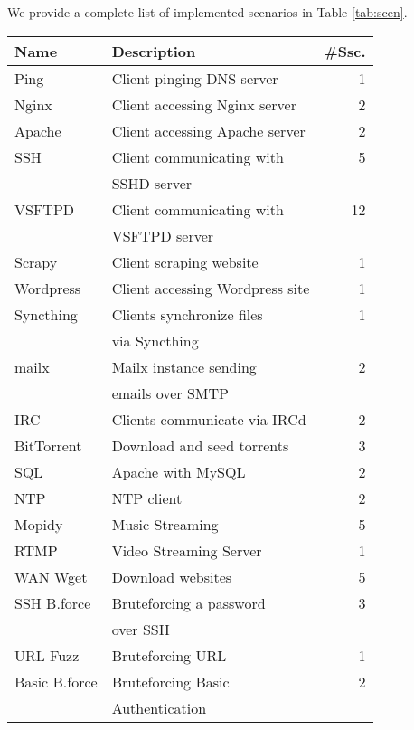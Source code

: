 \documentclass[sigconf]{acmart}
\begin{document}





We provide a complete list of implemented scenarios in Table \ref{tab:scen}.

\begin{table}
\begin{tabular}{l|l|r}
 \hline
 Name & Description & \#Ssc. \\
 \hline
 Ping & Client pinging DNS server & 1 \\
 Nginx & Client accessing Nginx server & 2\\
 Apache & Client accessing Apache server & 2\\
 SSH & Client communicating with & 5\\
 &SSHD server&\\
 VSFTPD & Client communicating with & 12\\
 &VSFTPD server&\\
 Scrapy & Client scraping website & 1 \\
 Wordpress & Client accessing Wordpress site & 1\\
 Syncthing& Clients synchronize files & 1\\
 &via Syncthing&\\
 mailx& Mailx instance sending & 2\\
 &emails over SMTP &\\
 IRC & Clients communicate via IRCd& 2\\
 BitTorrent & Download and seed torrents & 3 \\
 SQL & Apache with MySQL & 2\\
 NTP & NTP client & 2\\
 Mopidy & Music Streaming & 5\\
 RTMP & Video Streaming Server & 1\\
 WAN Wget & Download websites & 5 \\
 \hline
 SSH B.force & Bruteforcing a password & 3\\
 &over SSH&\\
 URL Fuzz & Bruteforcing URL & 1\\
 Basic B.force & Bruteforcing Basic & 2\\
 &Authentication&\\

\end{tabular}
\end{table}
\end{document}
